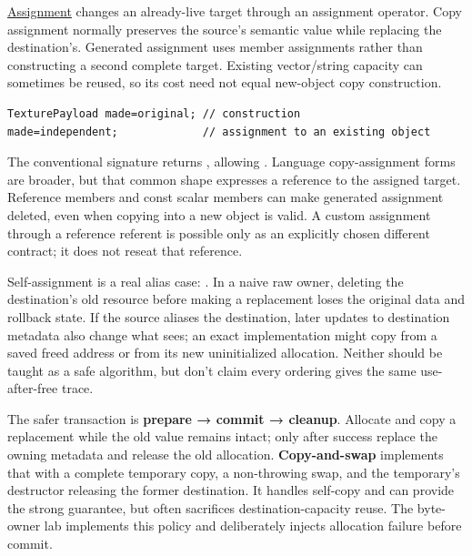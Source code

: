 \hypertarget{01-foundations-i-ch003-replacing-a-value-is-not-creating-an-object}{}

\hyperref[appendix-bea6beb5350f]{Assignment} changes an already-live target through an assignment operator. Copy assignment normally preserves the source's semantic value while replacing the destination's. Generated assignment uses member assignments rather than constructing a second complete target. Existing vector/string capacity can sometimes be reused, so its cost need not equal new-object copy construction.

\begin{verbatim}
TexturePayload made=original; // construction
made=independent;             // assignment to an existing object
\end{verbatim}

The conventional signature  returns , allowing . Language copy-assignment forms are broader, but that common shape expresses a reference to the assigned target. Reference members and const scalar members can make generated assignment deleted, even when copying into a new object is valid. A custom assignment through a reference referent is possible only as an explicitly chosen different contract; it does not reseat that reference.

Self-assignment is a real alias case: . In a naive raw owner, deleting the destination's old resource before making a replacement loses the original data and rollback state. If the source aliases the destination, later updates to destination metadata also change what  sees; an exact implementation might copy from a saved freed address or from its new uninitialized allocation. Neither should be taught as a safe algorithm, but don't claim every ordering gives the same use-after-free trace.

The safer transaction is \textbf{prepare → commit → cleanup}. Allocate and copy a replacement while the old value remains intact; only after success replace the owning metadata and release the old allocation. \textbf{Copy-and-swap} implements that with a complete temporary copy, a non-throwing swap, and the temporary's destructor releasing the former destination. It handles self-copy and can provide the strong guarantee, but often sacrifices destination-capacity reuse. The byte-owner lab implements this policy and deliberately injects allocation failure before commit.

